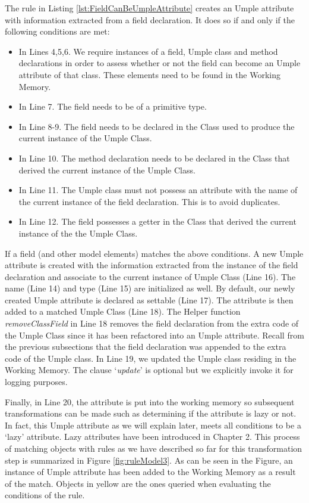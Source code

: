 The rule in Listing \ref{lst:FieldCanBeUmpleAttribute} creates an Umple attribute with information extracted from a field declaration. It does so if and only if the following conditions are met:
\begin{itemize}
\item In Lines 4,5,6. We require instances of a field, Umple class and method declarations in order to assess whether or not the field can become an Umple attribute of that class. These elements need to be found in the Working Memory. 

\item In Line 7. The field needs to be of a primitive type.

\item In Line 8-9. The field needs to be declared in the Class used to produce the current instance of the Umple Class.

\item In Line 10. The method declaration needs to be declared in the Class that derived the current instance of the Umple Class.

\item In Line 11. The Umple class must not possess an attribute with the name of the current instance of the field declaration. This is to avoid duplicates.

\item In Line 12. The field possesses a getter in the Class that derived the current instance of the the Umple Class.
\end{itemize}

If a field (and other model elements) matches the above conditions. A new Umple attribute is created with the information extracted from the instance of the field declaration and associate to the current instance of Umple Class (Line 16). The name (Line 14) and type (Line 15) are initialized as well. By default, our newly created Umple attribute is declared as settable (Line 17). The attribute is then added to a matched Umple Class (Line 18). The Helper function \textit{removeClassField} in Line 18 removes the field declaration from the extra code of the Umple Class since it has been refactored into an Umple attribute. Recall from the previous subsections that the field declaration was appended to the extra code of the Umple class. In Line 19, we updated the Umple class residing in the Working Memory. The clause `\textit{update}' is optional but we explicitly invoke it for logging purposes.

Finally, in Line 20, the attribute is put into the working memory so subsequent transformations can be made such as determining if the attribute is lazy or not. In fact, this Umple attribute as we will explain later, meets all conditions to be a `lazy' attribute. Lazy attributes have been introduced in Chapter 2. This process of matching objects with rules as we have described so far for this transformation step is summarized in Figure \ref{fig:ruleModel3}. As can be seen in the Figure, an instance of Umple attribute has been added to the Working Memory as a result of the match. Objects in yellow are the ones queried when evaluating the conditions of the rule. 

